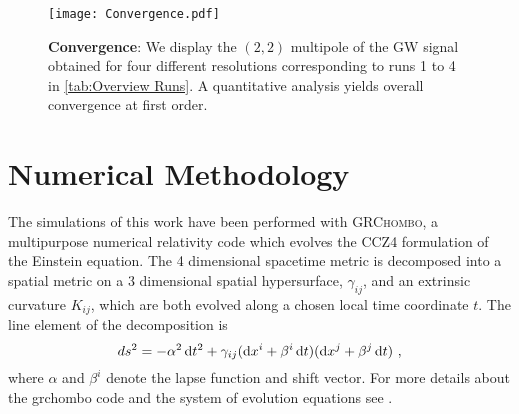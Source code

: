 \documentclass[11pt]{report}  %
\newcommand{\grchombo}{\textsc{GRChombo}\xspace}
\begin{document}
\clearpage \appendix
\begin{figure}[t]
\begin{center}
{\texttt{[image: Convergence.pdf]}}
\caption{{\bf Convergence}: We display the $(2,2)$ multipole
of the GW signal obtained for four different resolutions
corresponding to runs 1 to 4 in \cref{tab:Overview Runs}.
A quantitative analysis yields overall convergence at
first order.
    }
\label{fig:Convergence}
\end{center}
\end{figure}
\section{Numerical Methodology}\label{appendix:numerical_methodology}

The simulations of this work have been performed with
\grchombo, a multipurpose numerical relativity code
\cite{Andrade:2021rbd,Radia:2021smk,Clough:2015sqa} which evolves the CCZ4 \cite{Gundlach:2005eh,Alic:2011gg}
formulation of the Einstein equation. The 4 dimensional spacetime metric is
decomposed into a spatial metric on a 3 dimensional spatial hypersurface,
$\gamma_{ij}$, and an extrinsic curvature $K_{ij}$, which are both evolved along
a chosen local time coordinate $t$. The line element of the decomposition is
\begin{equation}
ds^2=-\alpha^2\,{\rm d}t^2+\gamma_{ij}({\rm d}x^i + \beta^i\,{\rm d}t)({\rm d}x^j + \beta^j\,{\rm d}t)~,
\end{equation}
where $\alpha$ and $\beta^i$ denote the lapse function and shift vector. For more details about the {\sc grchombo} code and the
system of evolution equations see \cite{Radia:2021smk,Andrade:2021rbd}.
\end{document}
